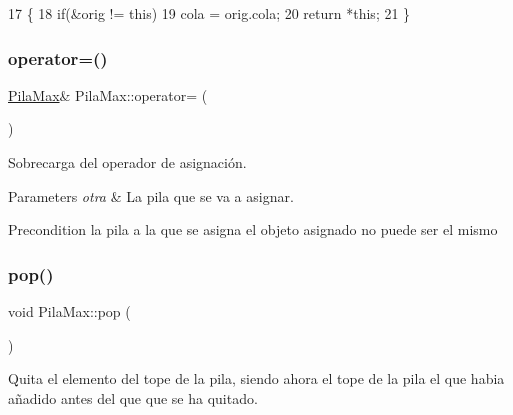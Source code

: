 \begin{DoxyCode}
17                                                \{
18   \textcolor{keywordflow}{if}(&orig != \textcolor{keyword}{this})
19     cola = orig.cola;
20   \textcolor{keywordflow}{return} *\textcolor{keyword}{this};
21 \}
\end{DoxyCode}
\mbox{\label{classPilaMax_aea02040ccd829163ee20c7ec6faeb887}} 
\subsubsection{\texorpdfstring{operator=()}{operator=()}\hspace{0.1cm}{\footnotesize\ttfamily [2/2]}}
{\footnotesize\ttfamily \hyperlink{classPilaMax}{Pila\+Max}\& Pila\+Max\+::operator= (\begin{DoxyParamCaption}\item[{const \hyperlink{classPilaMax}{Pila\+Max} \&}]{ }\end{DoxyParamCaption})}



Sobrecarga del operador de asignación. 


\begin{DoxyParams}{Parameters}
{\em otra} & La pila que se va a asignar. \\
\hline
\end{DoxyParams}
\begin{DoxyPrecond}{Precondition}
la pila a la que se asigna el objeto asignado no puede ser el mismo 
\end{DoxyPrecond}
\mbox{\label{classPilaMax_ac728a5593dbd9acb5d400f416e680736}} 
\subsubsection{\texorpdfstring{pop()}{pop()}\hspace{0.1cm}{\footnotesize\ttfamily [1/2]}}
{\footnotesize\ttfamily void Pila\+Max\+::pop (\begin{DoxyParamCaption}{ }\end{DoxyParamCaption})}



Quita el elemento del tope de la pila, siendo ahora el tope de la pila el que habia añadido antes del que que se ha quitado. 

